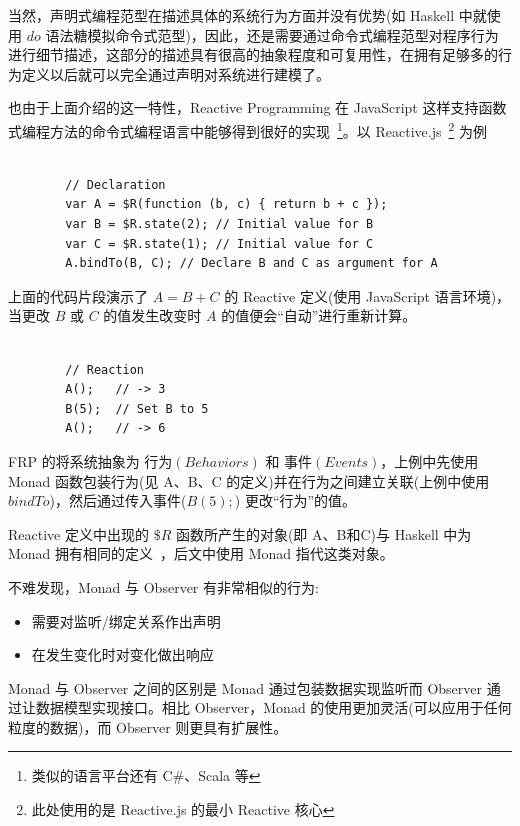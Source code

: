 当然，声明式编程范型在描述具体的系统行为方面并没有优势(如 Haskell 中就使用 $do$ 语法糖模拟命令式范型)，因此，还是需要通过命令式编程范型对程序行为进行细节描述，这部分的描述具有很高的抽象程度和可复用性，在拥有足够多的行为定义以后就可以完全通过声明对系统进行建模了。

也由于上面介绍的这一特性，Reactive Programming 在 JavaScript 这样支持函数式编程方法的命令式编程语言中能够得到很好的实现~\footnote{类似的语言平台还有 C\#、Scala 等}。以 Reactive.js~\footnote{此处使用的是 Reactive.js 的最小 Reactive 核心} 为例~\cite{Carkci2013}

\begin{verbatim}

        // Declaration
        var A = $R(function (b, c) { return b + c });
        var B = $R.state(2); // Initial value for B
        var C = $R.state(1); // Initial value for C
        A.bindTo(B, C); // Declare B and C as argument for A

\end{verbatim}

上面的代码片段演示了 $A = B + C$ 的 Reactive 定义(使用 JavaScript 语言环境)，当更改 $B$ 或 $C$ 的值发生改变时 $A$ 的值便会“自动”进行重新计算。

\begin{verbatim}

        // Reaction
        A();   // -> 3
        B(5);  // Set B to 5
        A();   // -> 6

\end{verbatim}

FRP 的将系统抽象为 $行为(Behaviors)$ 和 $事件(Events)$，上例中先使用 Monad 函数包装行为(见 A、B、C 的定义)并在行为之间建立关联(上例中使用 $bindTo$)，然后通过传入事件($B(5);$) 更改“行为”的值。

Reactive 定义中出现的 $\$R$ 函数所产生的对象(即 A、B和C)与 Haskell 中为 Monad 拥有相同的定义~\cite{raey}，后文中使用 Monad 指代这类对象。

不难发现，Monad 与 Observer 有非常相似的行为:

\begin{itemize}
  \item 需要对监听/绑定关系作出声明
  \item 在发生变化时对变化做出响应
\end{itemize}

Monad 与 Observer 之间的区别是 Monad 通过包装数据实现监听而 Observer 通过让数据模型实现接口。相比 Observer，Monad 的使用更加灵活(可以应用于任何粒度的数据)，而 Observer 则更具有扩展性。

